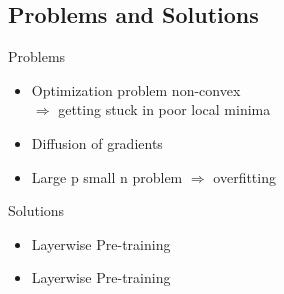 	
	\subsection{Problems and Solutions}
	\begin{frame}[t]{Problems}
		\begin{itemize}
			\item Optimization problem non-convex\\
			$\Rightarrow$ getting stuck in poor local minima
			\item Diffusion of gradients
			\item Large p small n problem $\Rightarrow$ overfitting
	
	\end{itemize}

	\end{frame}
	\begin{frame}[t]{Solutions}
		\begin{minipage}[h]{0.48\linewidth}
			\begin{itemize}
				\item Layerwise Pre-training
			\end{itemize}
		\end{minipage}\hfill
		\begin{minipage}[h]{0.48\linewidth}
			\begin{itemize}
				\item Layerwise Pre-training
			\end{itemize}
		\end{minipage}		
	\end{frame}



